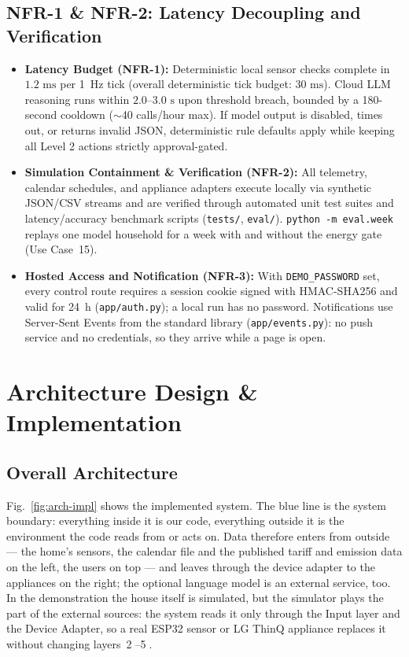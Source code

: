\documentclass[conference]{IEEEtran}
\begin{document}
\subsection{NFR-1 \& NFR-2: Latency Decoupling and Verification}
\begin{itemize}
    \item \textbf{Latency Budget (NFR-1):} Deterministic local sensor checks complete in $1.2\text{ ms}$ per 1~Hz tick (overall deterministic tick budget: $30\text{ ms}$). Cloud LLM reasoning runs within $2.0$--$3.0\text{ s}$ upon threshold breach, bounded by a 180-second cooldown ($\sim$40 calls/hour max). If model output is disabled, times out, or returns invalid JSON, deterministic rule defaults apply while keeping all Level 2 actions strictly approval-gated.
    \item \textbf{Simulation Containment \& Verification (NFR-2):} All telemetry, calendar schedules, and appliance adapters execute locally via synthetic JSON/CSV streams and are verified through automated unit test suites and latency/accuracy benchmark scripts (\texttt{tests/}, \texttt{eval/}). \texttt{python -m eval.week} replays one model household for a week with and without the energy gate (Use Case~15).
    \item \textbf{Hosted Access and Notification (NFR-3):} With \texttt{DEMO\_PASSWORD} set, every control route requires a session cookie signed with HMAC-SHA256 and valid for 24~h (\texttt{app/auth.py}); a local run has no password. Notifications use Server-Sent Events from the standard library (\texttt{app/events.py}): no push service and no credentials, so they arrive while a page is open.
\end{itemize}

\section{Architecture Design \& Implementation}

\subsection{Overall Architecture}
Fig.~\ref{fig:arch-impl} shows the implemented system. The blue line is the system boundary: everything inside it is our code, everything outside it is the environment the code reads from or acts on. Data therefore enters from outside --- the home's sensors, the calendar file and the published tariff and emission data on the left, the users on top --- and leaves through the device adapter to the appliances on the right; the optional language model is an external service, too. In the demonstration the house itself is simulated, but the simulator plays the part of the external sources: the system reads it only through the Input layer and the Device Adapter, so a real ESP32 sensor or LG ThinQ appliance replaces it without changing layers~\textcircled{\scriptsize 2}--\textcircled{\scriptsize 5}.
\end{document}
